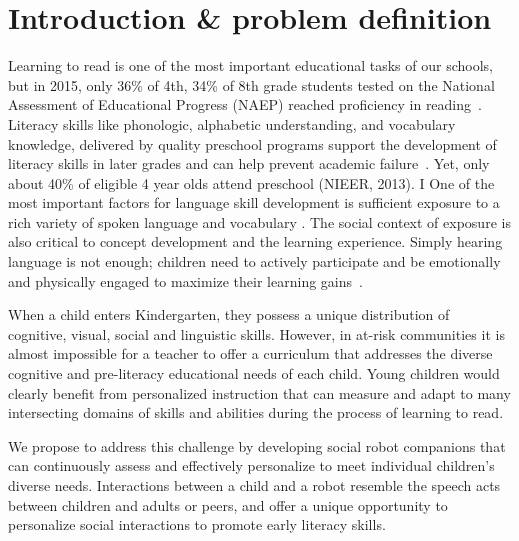 
\vspace{-4mm}   
\section{Introduction \& problem definition}
 \vspace{-3mm}   
Learning to read is one of the most important educational tasks of our schools, but in 2015, only 36\% of 4th, 34\% of 8th grade students tested on the National Assessment of Educational Progress (NAEP) reached proficiency in reading~\cite{nces2015}. Literacy skills like phonologic, alphabetic understanding, and vocabulary knowledge, delivered by quality preschool programs support the development of literacy skills in later grades and can help prevent academic failure~\cite{hart1995meaningful,paez2007dual}. Yet, only about 40\% of eligible 4 year olds attend preschool (NIEER, 2013).
I 
One of the most important factors for language skill development is sufficient exposure to a rich variety of spoken language and vocabulary \cite{asaridou2016pace}. The social context of exposure is also critical to concept development and the learning experience. Simply hearing language is not enough; children need to actively participate and be emotionally and physically engaged to maximize their learning gains~\cite{wells2000dialogic}. 

When a child enters Kindergarten, they possess a unique distribution of cognitive, visual, social and linguistic skills. However, in at-risk communities it is almost impossible for a teacher to offer a curriculum that addresses the diverse cognitive and pre-literacy educational needs of each child. Young children would clearly benefit from personalized instruction that can measure and adapt to many intersecting domains of skills and abilities during the process of learning to read. 

We propose to address this challenge by developing social robot companions that can continuously assess and effectively personalize to meet individual children's diverse needs. Interactions between a child and a robot resemble the speech acts between children and adults or peers, and offer a unique opportunity to personalize social interactions to promote early literacy skills.

\vspace{-4mm}   
